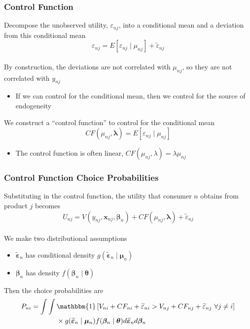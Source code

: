 \documentclass{beamer}
\begin{document}
\begin{frame}\frametitle{Control Function}
    Decompose the unobserved utility, $\varepsilon_{nj}$, into a conditional mean and a deviation from this conditional mean
    $$\varepsilon_{nj} = E[\varepsilon_{nj} \mid \mu_{nj}] + \widetilde{\varepsilon}_{nj}$$ \\
    \vspace{2ex}
    By construction, the deviations are not correlated with $\mu_{nj}$, so they are not correlated with $y_{nj}$
    \begin{itemize}
        \item If we can control for the conditional mean, then we control for the source of endogeneity
    \end{itemize}
    \vspace{2ex}
    We construct a ``control function'' to control for the conditional mean
    $$CF(\mu_{nj}, \bm{\lambda}) = E[\varepsilon_{nj} \mid \mu_{nj}]$$
    \vspace{-3ex}
    \begin{itemize}
        \item The control function is often linear, $CF(\mu_{nj}, \lambda) = \lambda \mu_{nj}$
    \end{itemize}
\end{frame}

\begin{frame}\frametitle{Control Function Choice Probabilities}
    Substituting in the control function, the utility that consumer $n$ obtains from product $j$ becomes
    $$U_{nj} = V(y_{nj}, \bm{x}_{nj}, \bm{\beta}_n) + CF(\mu_{nj}, \bm{\lambda}) + \widetilde{\varepsilon}_{nj}$$ \\
    \vspace{3ex}
    We make two distributional assumptions
    \begin{itemize}
        \item $\widetilde{\bm{\varepsilon}}_n$ has conditional density $g(\widetilde{\bm{\varepsilon}}_n \mid \bm{\mu}_n)$
        \item $\bm{\beta}_n$ has density $f(\bm{\beta}_n \mid \bm{\theta})$
    \end{itemize}
    \vspace{3ex}
    Then the choice probabilities are
    \begin{align*}
        P_{ni} & = \int \int \mathbbm{1} \left[ V_{ni} + CF_{ni} + \widetilde{\varepsilon}_{ni} > V_{nj} + CF_{nj} + \widetilde{\varepsilon}_{nj} ~ \forall j \neq i \right] \\
        & \qquad \quad ~~ \times g(\widetilde{\bm{\varepsilon}}_n \mid \bm{\mu}_n) f(\bm{\beta}_n \mid \bm{\theta}) d \widetilde{\bm{\varepsilon}}_n d \bm{\beta}_n
    \end{align*}
\end{frame}
\end{document}
